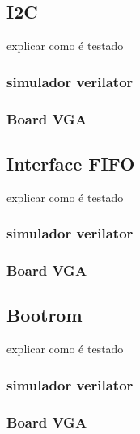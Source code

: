 \subsection{I2C}

explicar como é testado

\subsubsection{simulador verilator}

\subsubsection{Board VGA}

\subsection{Interface FIFO}

explicar como é testado

\subsubsection{simulador verilator}

\subsubsection{Board VGA}

\subsection{Bootrom}

explicar como é testado

\subsubsection{simulador verilator}

\subsubsection{Board VGA}
